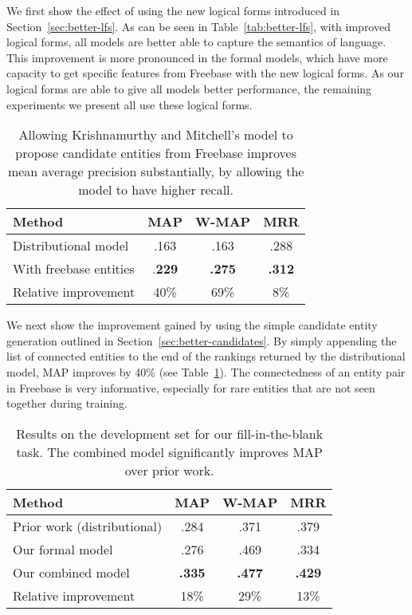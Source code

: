 \documentclass[11pt]{article}
\newcommand{\secref}[1]{Section~\ref{sec:#1}}
\newcommand{\tabref}[1]{Table~\ref{tab:#1}}
\begin{document}
We first show the effect of using the new logical forms introduced in
\secref{better-lfs}.  As can be seen in \tabref{better-lfs}, with
improved logical forms, all models are better able to capture the
semantics of language.  This improvement is more pronounced in the
formal models, which have more capacity to get specific features from
Freebase with the new logical forms.  As our logical forms are able to
give all models better performance, the remaining experiments we
present all use these logical forms.

\begin{table}
  \centering
  {\small
    \begin{tabular}{lccc}
      \toprule
      Method & MAP & W-MAP & MRR \\
      \midrule
      Distributional model & .163 & .163 & .288 \\
      \midrule
      With freebase entities & .\textbf{229} & \textbf{.275} & \textbf{.312} \\
      \midrule
      \midrule
      Relative improvement & 40\% & 69\% & 8\% \\
      \bottomrule
    \end{tabular}
  }
  \caption{Allowing Krishnamurthy and Mitchell's model to propose
  candidate entities from Freebase improves mean average precision
  substantially, by allowing the model to have higher recall.}
  \label{tab:better-candidates}
\end{table}

We next show the improvement gained by using the simple candidate
entity generation outlined in \secref{better-candidates}.  By simply
appending the list of connected entities to the end of the rankings
returned by the distributional model, MAP improves by 40\% (see
\tabref{better-candidates}).  The connectedness of an entity pair in
Freebase is very informative, especially for rare entities that are
not seen together during training.

\begin{table}
  \centering
  {\small
    \begin{tabular}{lccc}
      \toprule
      Method & MAP & W-MAP & MRR \\
      \midrule
      Prior work (distributional) & .284 & .371 & .379 \\
      \midrule
      Our formal model & .276 & .469 & .334 \\
      \midrule
      Our combined model & \textbf{.335} & \textbf{.477} & \textbf{.429} \\
      \midrule
      \midrule
      Relative improvement & 18\% & 29\% & 13\% \\
      \bottomrule
    \end{tabular}
  }
  \caption{Results on the development set for our fill-in-the-blank task.  The
  combined model significantly improves MAP over prior work.}
  \label{tab:dev-results}
\end{table}
\end{document}
